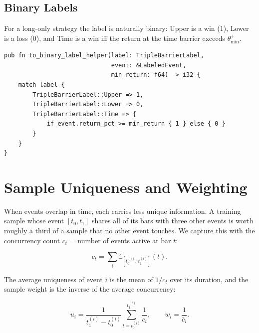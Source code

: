 \subsection{Binary Labels}

For a long-only strategy the label is naturally binary: Upper is a
win (1), Lower is a loss (0), and Time is a win iff the return at
the time barrier exceeds $\theta^+_{\min}$.

\begin{lstlisting}[caption={Converting a triple-barrier label to a binary outcome}]
pub fn to_binary_label_helper(label: TripleBarrierLabel,
                              event: &LabeledEvent,
                              min_return: f64) -> i32 {
    match label {
        TripleBarrierLabel::Upper => 1,
        TripleBarrierLabel::Lower => 0,
        TripleBarrierLabel::Time => {
            if event.return_pct >= min_return { 1 } else { 0 }
        }
    }
}
\end{lstlisting}

\section{Sample Uniqueness and Weighting}

When events overlap in time, each carries less unique information. A
training sample whose event $[t_0, t_1]$ shares all of its bars with
three other events is worth roughly a third of a sample that no other
event touches. We capture this with the concurrency count
$c_t$ = number of events active at bar $t$:

\begin{equation}
    c_t = \sum_i \mathbb{1}_{[t_0^{(i)},\, t_1^{(i)}]}(t).
\end{equation}

The average uniqueness of event $i$ is the mean of $1/c_t$ over its
duration, and the sample weight is the inverse of the average
concurrency:

\begin{equation}
    u_i = \frac{1}{t_1^{(i)} - t_0^{(i)}} \sum_{t=t_0^{(i)}}^{t_1^{(i)}} \frac{1}{c_t},
    \qquad
    w_i = \frac{1}{\bar{c}_i}.
\end{equation}



